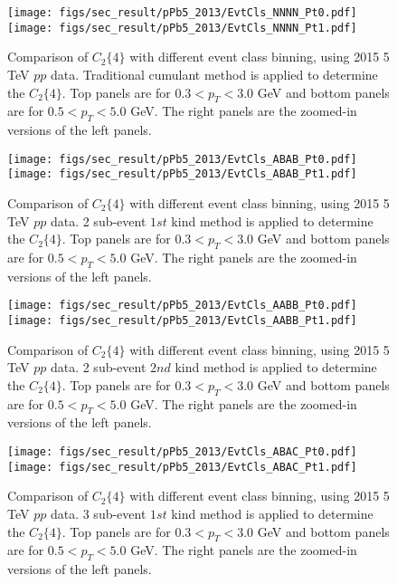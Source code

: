 \begin{figure}[H]
\centering
\texttt{[image: figs/sec\_result/pPb5\_2013/EvtCls\_NNNN\_Pt0.pdf]}
\texttt{[image: figs/sec\_result/pPb5\_2013/EvtCls\_NNNN\_Pt1.pdf]}
\caption{Comparison of $C_{2}\{4\}$ with different event class binning, using 2015 5 TeV $pp$ data. Traditional cumulant method is applied to determine the $C_{2}\{4\}$. Top panels are for $0.3<p_{T}<3.0$ GeV and bottom panels are for $0.5<p_{T}<5.0$ GeV. The right panels are the zoomed-in versions of the left panels.}
\label{fig:result_pPb5_2013_EvtCls_NNNN}
\end{figure}

\begin{figure}[H]
\centering
\texttt{[image: figs/sec\_result/pPb5\_2013/EvtCls\_ABAB\_Pt0.pdf]}
\texttt{[image: figs/sec\_result/pPb5\_2013/EvtCls\_ABAB\_Pt1.pdf]}
\caption{Comparison of $C_{2}\{4\}$ with different event class binning, using 2015 5 TeV $pp$ data. 2 sub-event $1st$ kind method is applied to determine the $C_{2}\{4\}$. Top panels are for $0.3<p_{T}<3.0$ GeV and bottom panels are for $0.5<p_{T}<5.0$ GeV. The right panels are the zoomed-in versions of the left panels.}
\label{fig:result_pPb5_2013_EvtCls_ABAB}
\end{figure}

\begin{figure}[H]
\centering
\texttt{[image: figs/sec\_result/pPb5\_2013/EvtCls\_AABB\_Pt0.pdf]}
\texttt{[image: figs/sec\_result/pPb5\_2013/EvtCls\_AABB\_Pt1.pdf]}
\caption{Comparison of $C_{2}\{4\}$ with different event class binning, using 2015 5 TeV $pp$ data. 2 sub-event $2nd$ kind method is applied to determine the $C_{2}\{4\}$. Top panels are for $0.3<p_{T}<3.0$ GeV and bottom panels are for $0.5<p_{T}<5.0$ GeV. The right panels are the zoomed-in versions of the left panels.}
\label{fig:result_pPb5_2013_EvtCls_AABB}
\end{figure}

\begin{figure}[H]
\centering
\texttt{[image: figs/sec\_result/pPb5\_2013/EvtCls\_ABAC\_Pt0.pdf]}
\texttt{[image: figs/sec\_result/pPb5\_2013/EvtCls\_ABAC\_Pt1.pdf]}
\caption{Comparison of $C_{2}\{4\}$ with different event class binning, using 2015 5 TeV $pp$ data. 3 sub-event $1st$ kind method is applied to determine the $C_{2}\{4\}$. Top panels are for $0.3<p_{T}<3.0$ GeV and bottom panels are for $0.5<p_{T}<5.0$ GeV. The right panels are the zoomed-in versions of the left panels.}
\label{fig:result_pPb5_2013_EvtCls_ABAC}
\end{figure}

